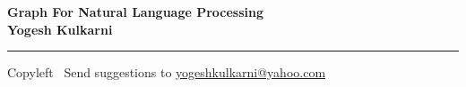 
\graphicspath{{images/}}

\footnotesize


\begin{center}
\Large{\textbf{Graph For Natural Language Processing\\ Yogesh Kulkarni}}  
\end{center}

\begin{multicols}{2}

\end{multicols}

\rule{\linewidth}{0.25pt}
\scriptsize
Copyleft \textcopyleft\  Send suggestions to 
\href{http://www.yogeshkulkarni.com}{yogeshkulkarni@yahoo.com}


